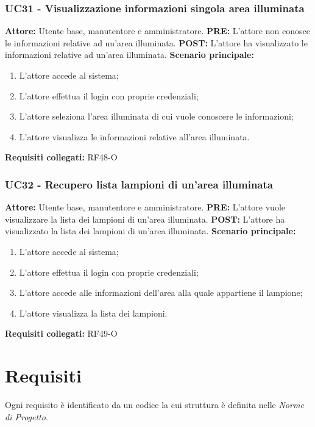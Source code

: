 \documentclass[a4paper, 12pt]{article}
\begin{document}
\subsubsection{UC31 - Visualizzazione informazioni singola area illuminata}
\textbf{Attore: } Utente base, manutentore e amministratore.\newline
\textbf{PRE: } L'attore non conosce le informazioni relative ad un'area illuminata.\newline
\textbf{POST: } L'attore ha visualizzato le informazioni relative ad un'area illuminata.\newline
\textbf{Scenario principale: }
\begin{enumerate}
    \item L'attore accede al sistema;
    \item L'attore effettua il login con proprie credenziali;
    \item L'attore seleziona l'area illuminata di cui vuole conoscere le informazioni;
    \item L'attore visualizza le informazioni relative all'area illuminata.
\end{enumerate}
\textbf{Requisiti collegati: } RF48-O\newline

\subsubsection{UC32 - Recupero lista lampioni di un'area illuminata}
\textbf{Attore: } Utente base, manutentore e amministratore.\newline
\textbf{PRE: } L'attore vuole visualizzare la lista dei lampioni di un'area illuminata.\newline
\textbf{POST: } L'attore ha visualizzato la lista dei lampioni di un'area illuminata.\newline
\textbf{Scenario principale: }
\begin{enumerate}
    \item L'attore accede al sistema;
    \item L'attore effettua il login con proprie credenziali;
    \item L'attore accede alle informazioni dell'area alla quale appartiene il lampione;
    \item L'attore visualizza la lista dei lampioni.
\end{enumerate}
\textbf{Requisiti collegati: } RF49-O\newline
\newpage
\section{Requisiti}
Ogni requisito è identificato da un codice la cui struttura è definita nelle \textit{Norme di Progetto}.
\end{document}
